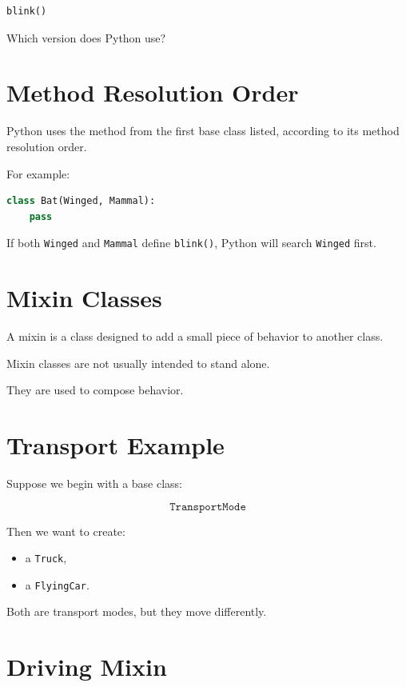 \documentclass[11pt]{article}
\begin{document}
\begin{lstlisting}[language=Python]
blink()
\end{lstlisting}

Which version does Python use?

\section{Method Resolution Order}

Python uses the method from the first base class listed, according to its method resolution order.

For example:

\begin{lstlisting}[language=Python]
class Bat(Winged, Mammal):
    pass
\end{lstlisting}

If both \texttt{Winged} and \texttt{Mammal} define \texttt{blink()}, Python will search \texttt{Winged} first.

\section{Mixin Classes}

A mixin is a class designed to add a small piece of behavior to another class.

Mixin classes are not usually intended to stand alone.

They are used to compose behavior.

\section{Transport Example}

Suppose we begin with a base class:

\[
\texttt{TransportMode}
\]

Then we want to create:

\begin{itemize}
    \item a \texttt{Truck},
    \item a \texttt{FlyingCar}.
\end{itemize}

Both are transport modes, but they move differently.

\section{Driving Mixin}
\end{document}
